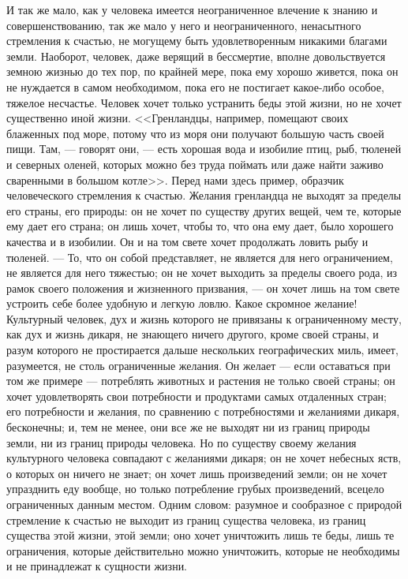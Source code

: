 \documentclass[12pt]{article}
\begin{document}
И так же мало, как у человека имеется неограниченное влечение к знанию и совершенствованию, так же мало у него и неограниченного, ненасытного стремления к счастью, не могущему быть удовлетворенным никакими благами земли. Наоборот, человек, даже верящий в бессмертие, вполне довольствуется земною жизнью до тех пор, по крайней мере, пока ему хорошо живется, пока он не нуждается в самом необходимом, пока его не постигает какое-либо особое, тяжелое несчастье. Человек хочет только устранить беды этой жизни, но не хочет существенно иной жизни. <<Гренландцы, например, помещают своих блаженных под море, потому что из моря они получают большую часть своей пищи. Там, --- говорят они, --- есть хорошая вода и изобилие птиц, рыб, тюленей и северных оленей, которых можно без труда поймать или даже найти заживо сваренными в большом котле>>. Перед нами здесь пример, образчик человеческого стремления к счастью. Желания гренландца не выходят за пределы его страны, его природы: он не хочет по существу других вещей, чем те, которые ему дает его страна; он лишь хочет, чтобы то, что она ему дает, было хорошего качества и в изобилии. Он и на том свете хочет продолжать ловить рыбу и тюленей. --- То, что он собой представляет, не является для него ограничением, не является для него тяжестью; он не хочет выходить за пределы своего рода, из рамок своего положения и жизненного призвания, --- он хочет лишь на том свете устроить себе более удобную и легкую ловлю. Какое скромное желание! Культурный человек, дух и жизнь которого не привязаны к ограниченному месту, как дух и жизнь дикаря, не знающего ничего другого, кроме своей страны, и разум которого не простирается дальше нескольких географических миль, имеет, разумеется, не столь ограниченные желания. Он желает --- если оставаться при том же примере --- потреблять животных и растения не только своей страны; он хочет удовлетворять свои потребности и продуктами самых отдаленных стран; его потребности и желания, по сравнению с потребностями и желаниями дикаря, бесконечны; и, тем не менее, они все же не выходят ни из границ природы земли, ни из границ природы человека. Но по существу своему желания культурного человека совпадают с желаниями дикаря; он не хочет небесных яств, о которых он ничего не знает; он хочет лишь произведений земли; он не хочет упразднить еду вообще, но только потребление грубых произведений, всецело ограниченных данным местом. Одним словом: разумное и сообразное с природой стремление к счастью не выходит из границ существа человека, из границ существа этой жизни, этой земли; оно хочет уничтожить лишь те беды, лишь те ограничения, которые действительно можно уничтожить, которые не необходимы и не принадлежат к сущности жизни. 
\end{document}
